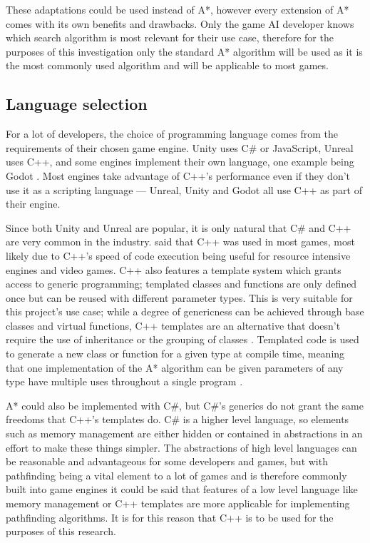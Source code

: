 \documentclass[11pt, a4paper]{report}
\begin{document}
These adaptations could be used instead of A*, however every extension of A* comes with its own benefits and drawbacks. Only the game AI developer knows which search algorithm is most relevant for their use case, therefore for the purposes of this investigation only the standard A* algorithm will be used as it is the most commonly used algorithm and will be applicable to most games.

\subsection{Language selection}
\label{subsec:languageSelection}

For a lot of developers, the choice of programming language comes from the requirements of their chosen game engine. Unity \parencite{Unity} uses C\# or JavaScript, Unreal \parencite{Unreal} uses C++, and some engines implement their own language, one example being Godot \parencite{Godot}. Most engines take advantage of C++'s performance even if they don't use it as a scripting language --- Unreal, Unity and Godot all use C++ as part of their engine. 

Since both Unity \parencite{Unity} and Unreal \parencite{Unreal} are popular, it is only natural that C\# and C++ are very common in the industry. \citeauthor{blow2004game} \parencite*[30]{blow2004game} said that C++ was used in most games, most likely due to C++'s speed of code execution being useful for resource intensive engines and video games. C++ also features a template system which grants access to generic programming; templated classes and functions are only defined once but can be reused with different parameter types. This is very suitable for this project's use case; while a degree of genericness can be achieved through base classes and virtual functions, C++ templates are an alternative that doesn't require the use of inheritance or the grouping of classes \parencite[117]{higgins2002generic}. Templated code is used to generate a new class or function for a given type at compile time, meaning that one implementation of the A* algorithm can be given parameters of any type have multiple uses throughout a single program \parencite[120]{higgins2002generic}.

A* could also be implemented with C\#, but C\#'s generics do not grant the same freedoms that C++'s templates do. C\# is a higher level language, so elements such as memory management are either hidden or contained in abstractions in an effort to make these things simpler. The abstractions of high level languages can be reasonable and advantageous for some developers and games, but with pathfinding being a vital element to a lot of games and is therefore commonly built into game engines it could be said that features of a low level language like memory management or C++ templates are more applicable for implementing pathfinding algorithms. It is for this reason that C++ is to be used for the purposes of this research.
\end{document}
